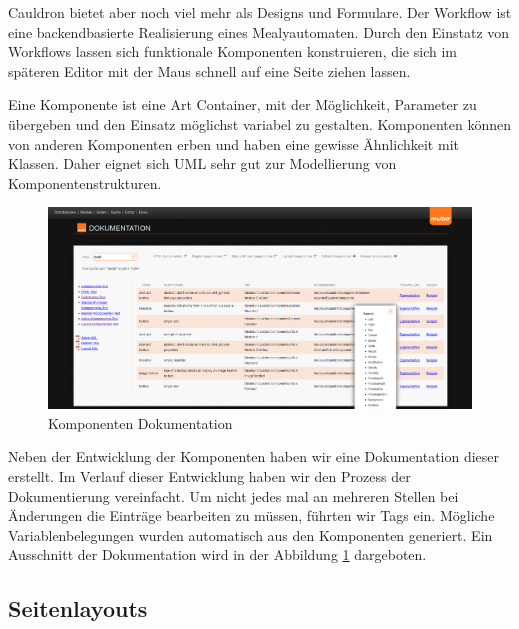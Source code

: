 \documentclass[12pt]{article}
\begin{document}
Cauldron bietet aber noch viel mehr als Designs und Formulare. Der Workflow ist eine backendbasierte Realisierung eines 
Mealyautomaten. Durch den Einstatz von Workflows lassen sich funktionale Komponenten konstruieren, die sich im späteren Editor
mit der Maus schnell auf eine Seite ziehen lassen.

Eine Komponente ist eine Art Container, mit der Möglichkeit, Parameter zu übergeben und den Einsatz möglichst variabel zu gestalten.
Komponenten können von anderen Komponenten erben und haben eine gewisse Ähnlichkeit mit Klassen. Daher eignet sich UML sehr gut zur
Modellierung von Komponentenstrukturen.

\begin{figure}[h]
	\centering
	\includegraphics[width=1.0\textwidth]{DokuPage.png}
	\caption{Komponenten Dokumentation}
	\label{fig:DokuPage}
\end{figure}

Neben der Entwicklung der Komponenten haben wir eine Dokumentation dieser erstellt. Im Verlauf dieser Entwicklung haben wir
den Prozess der Dokumentierung vereinfacht. Um nicht jedes mal an mehreren Stellen bei Änderungen die Einträge bearbeiten zu müssen,
führten wir Tags ein. Mögliche Variablenbelegungen wurden automatisch aus den Komponenten generiert. Ein Ausschnitt der Dokumentation
wird in der Abbildung \ref{fig:DokuPage} dargeboten.

\subsection{Seitenlayouts}
\end{document}
